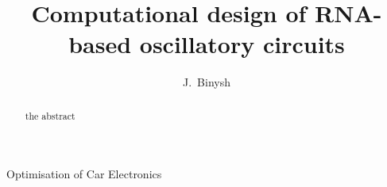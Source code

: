 \documentclass[11pt,journal]{./IEEE_latex_class/IEEEtran}
\begin{document}
%
\title{Computational design of RNA-based oscillatory circuits}

\author{J.~Binysh
        \\ 
        \vspace{-3em}}

%
{Optimisation of Car Electronics}

\maketitle

\thispagestyle{empty}

\newcommand{\MYheader}{\smash{\scriptsize

\hfil\parbox[t][\height][t]{\textwidth}{\centering {\normalsize
Place conference title here}}\hfil\hbox{}}}
\makeatletter

\if@twoside
  \def\ps@headings{%
      \let\@oddfoot\@empty\let\@evenfoot\@empty
      \def\@evenhead{\small\thepage\hfil\leftmark\strut\vadjust{\vskip .1ex\hrule}}%
      \def\@oddhead{\small\rightmark\hfil\thepage\strut\vadjust{\vskip .1ex\hrule}}%
      \let\@mkboth\markboth
    \def\chaptermark##1{%
      \markboth{\scshape%
        \ifnum \c@secnumdepth >\m@ne
            \@chapapp\ \thechapter. \ %
        \fi
        ##1}{}}%
    \def\sectionmark##1{%
      \markright{\scshape%
        \ifnum \c@secnumdepth >\z@
          \thesection. \ %
        \fi
        ##1}}}
\else
  \def\ps@headings{%
    \let\@oddfoot\@empty
    \def\@oddhead{{\slshape\rightmark}\hfil\thepage\ of\ \pageref{LastPage} \strut\vadjust{\vskip .1ex\hrule}}%
    \let\@mkboth\markboth
    \def\chaptermark##1{%
      \markright{\scshape%
        \ifnum \c@secnumdepth >\m@ne
            \@chapapp\ \thechapter. \ %
        \fi
        ##1}}}
\fi
\makeatother

\makeatother

\pagestyle{headings}

\begin{abstract}
the abstract
\end{abstract}
\end{document}
